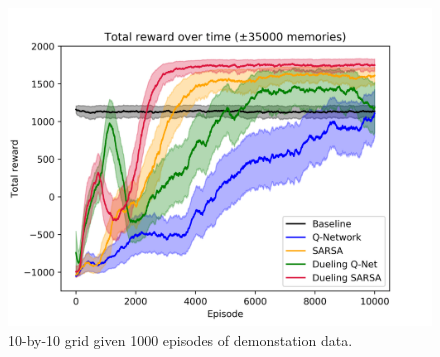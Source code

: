 \begin{figure}[H]
    \includegraphics[width=\linewidth]{img/results/10-sized/total_rewards_1000m-min.png}
    \caption{10-by-10 grid given 1000 episodes of demonstation data.}
    \label{fig:old-10sized-1000mem}
\end{figure}
\hspace{1cm} %

